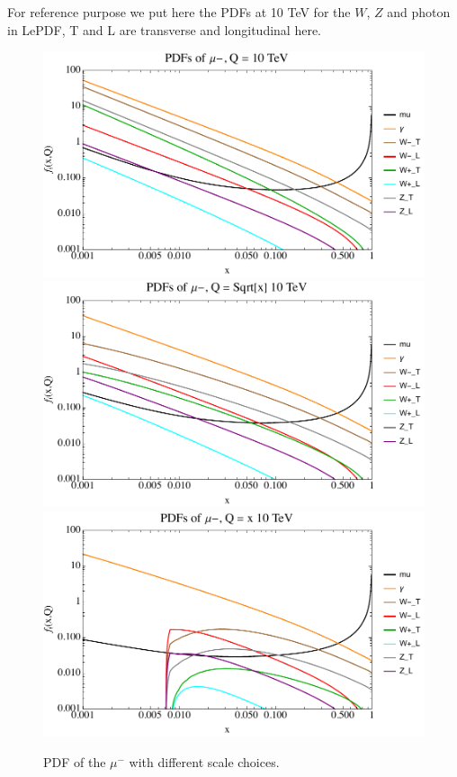 \documentclass[a4paper,11pt]{article}
\begin{document}
For reference purpose we put here the PDFs at 10 TeV for the $W$, $Z$ and photon in {\small \sc LePDF}, T and L are transverse and longitudinal here.

\begin{figure}[!t]
\includegraphics[width=0.46\linewidth]{Notebooks/PlotPDFs/alltogether/10TeV_mu-scaleQ.pdf}
\includegraphics[width=0.46\linewidth]{Notebooks/PlotPDFs/alltogether/10TeV_mu-scaleQsqrtx.pdf}
\includegraphics[width=0.46\linewidth]{Notebooks/PlotPDFs/alltogether/10TeV_mu-scaleQx.pdf}
\caption{PDF of the $\mu^-$ with different scale choices. \label{fig:allmum}}
\end{figure}
\end{document}
